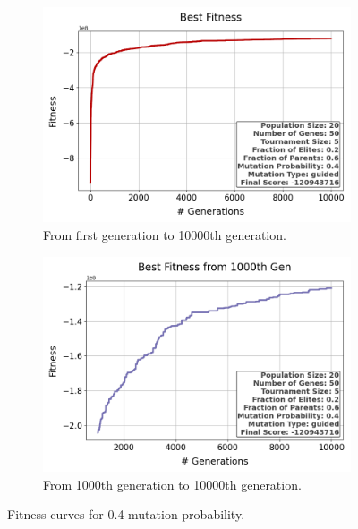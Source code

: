 \documentclass{assignment}
\begin{document}
\begin{figure}[H]
    \begin{subfigure}{0.5\textwidth}
        \includegraphics[width=\textwidth]{figures/best_fitness_output_20_50_5_0.2_0.6_0.4_guided.png}
        \caption{From first generation to 10000th generation.}
    \end{subfigure}\hfill
    \begin{subfigure}{0.5\textwidth}
        \includegraphics[width=\textwidth]{figures/best_fitness_1000_output_20_50_5_0.2_0.6_0.4_guided.png}
        \caption{From 1000th generation to 10000th generation.}
    \end{subfigure}
    \caption{Fitness curves for 0.4 mutation probability.}
\label{fig:0.4mutation}
\end{figure}
\end{document}
